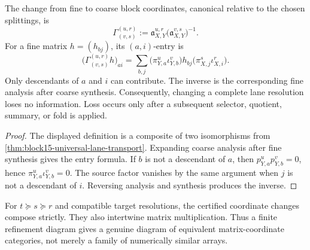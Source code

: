 \begin{proposition}
\label{prop:block15-certified-coarsening}
The change from fine to coarse block coordinates, canonical relative to the
chosen splittings, is
\[
 \Gamma^{(u,r)}_{(v,s)}
 :=
 \mathfrak a^{u,r}_{X,Y}
 \bigl(\mathfrak a^{v,s}_{X,Y}\bigr)^{-1}.
\]
For a fine matrix \(h=(h_{bj})\), its \((a,i)\)-entry is
\[
 \bigl(\Gamma^{(u,r)}_{(v,s)}h\bigr)_{a i}
 =
 \sum_{b,j}
 \bigl(\pi_{Y,a}^u\iota_{Y,b}^v\bigr)
 h_{bj}
 \bigl(\pi_{X,j}^s\iota_{X,i}^r\bigr).
\]
Only descendants of \(a\) and \(i\) can contribute.  The inverse is the
corresponding fine analysis after coarse synthesis.  Consequently, changing a
complete lane resolution loses no information.  Loss occurs only after a
subsequent selector, quotient, summary, or fold is applied.
\end{proposition}

\begin{proof}
The displayed definition is a composite of two isomorphisms from
\cref{thm:block15-universal-lane-transport}.  Expanding coarse analysis after
fine synthesis gives the entry formula.  If \(b\) is not a descendant of
\(a\), then
\(p_{Y,a}^up_{Y,b}^v=0\), hence
\(\pi_{Y,a}^u\iota_{Y,b}^v=0\).  The source factor vanishes by the same
argument when \(j\) is not a descendant of \(i\).  Reversing analysis and
synthesis produces the inverse.
\end{proof}

\begin{corollary}
\label{cor:block15-functorial-coarsening}
For \(t\succeq s\succeq r\) and compatible target resolutions,
the certified coordinate changes compose strictly.  They also intertwine
matrix multiplication.  Thus a finite refinement diagram gives a genuine
diagram of equivalent matrix-coordinate categories, not merely a family of
numerically similar arrays.
\end{corollary}

